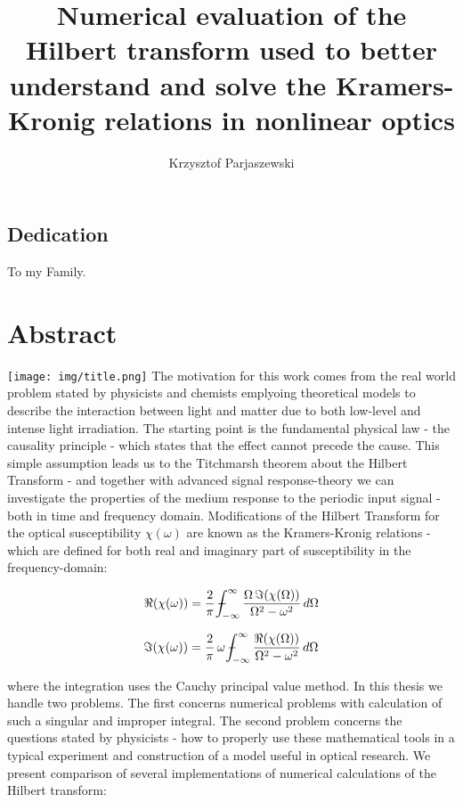 \documentclass[12pt,twoside,a4paper]{article}
\title{Numerical evaluation of the Hilbert transform used to better understand 
and solve the Kramers-Kronig relations in nonlinear optics}
\author{Krzysztof Parjaszewski}
\date{}
\numberwithin{equation}{subsection}
\numberwithin{figure}{subsection}
\def\Xint#1{\mathchoice
{\XXint\displaystyle\textstyle{#1}}%
{\XXint\textstyle\scriptstyle{#1}}%
{\XXint\scriptstyle\scriptscriptstyle{#1}}%
{\XXint\scriptscriptstyle\scriptscriptstyle{#1}}%
\!\int}
\def\XXint#1#2#3{{\setbox0=\hbox{$#1{#2#3}{\int}$ }\vcenter{\hbox{$#2#3$ }}\kern-.6\wd0}}
\def\dashint{\Xint-}
\begin{document}
\maketitle
\section*{} \label{chap:preamble} 
\subsection*{Dedication} \label{chap:pre_dedication}


To my Family.


\section*{Abstract} \label{chap:abstract}
\texttt{[image: img/title.png]}
The motivation for this work comes from the real world problem stated by physicists and chemists emplyoing theoretical models to
describe the interaction between light and matter due to both low-level and intense light irradiation. The starting point is the
fundamental physical law - the causality principle - which states that the effect cannot precede the cause. This simple assumption
leads us to the Titchmarsh theorem about the Hilbert Transform - and together with advanced signal response-theory we can
investigate the properties of the medium response to the periodic input signal - both in time and frequency domain. Modifications
of the Hilbert Transform for the optical susceptibility $\chi (\omega )$ are known as the Kramers-Kronig relations - which are
defined for both real and imaginary part of susceptibility in the frequency-domain:

\begin{equation*}
  \Re (\chi (\omega ))=\frac {2}{\pi}\,\dashint_{ - \infty }^{\infty } \frac {\Omega \,\Im (\chi (\Omega ))}{\Omega ^{2} - \omega
  ^{2}} \,d\Omega 
\end{equation*}

\begin{equation*}
  \Im (\chi (\omega ))=\frac {2}{\pi}\,\omega \,\dashint_{ - \infty }^{\infty }\frac {\Re (\chi (\Omega ))}{\Omega ^{2} - \omega
  ^{2}}\, d\Omega 
\end{equation*}

where the integration uses the Cauchy principal value method. In this thesis we handle two problems. The first concerns numerical
problems with calculation of such a singular and improper integral. The second problem concerns the questions stated by physicists
- how to properly use these mathematical tools in a typical experiment and construction of a model useful in optical research. We
present comparison of several implementations of numerical calculations of the Hilbert transform:
\end{document}
